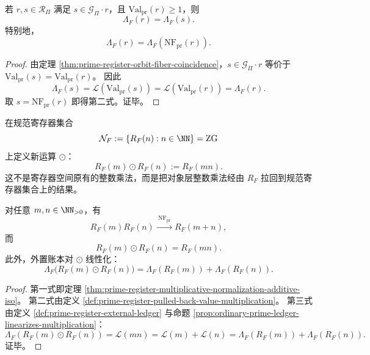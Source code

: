 \begin{proposition}[外置账本在值保持轨道上不变]\label{prop:prime-register-external-ledger-orbit-invariance}
若 \(r,s\in\mathcal R_{\Pi}\) 满足 \(s\in\mathcal G_{\Pi}\cdot r\)，且 \(\mathrm{Val}_{\mathrm{pr}}(r)\ge1\)，则
\[
\Lambda_F(r)=\Lambda_F(s).
\]
特别地，
\[
\Lambda_F(r)=\Lambda_F(\mathrm{NF}_{\mathrm{pr}}(r)).
\]
\end{proposition}

\begin{proof}
由定理 \ref{thm:prime-register-orbit-fiber-coincidence}，\(s\in\mathcal G_{\Pi}\cdot r\) 等价于 \(\mathrm{Val}_{\mathrm{pr}}(s)=\mathrm{Val}_{\mathrm{pr}}(r)\)。
因此
\[
\Lambda_F(s)=\mathcal L(\mathrm{Val}_{\mathrm{pr}}(s))
=\mathcal L(\mathrm{Val}_{\mathrm{pr}}(r))
=\Lambda_F(r).
\]
取 \(s=\mathrm{NF}_{\mathrm{pr}}(r)\) 即得第二式。证毕。
\end{proof}

\begin{definition}[拉回的值乘]\label{def:prime-register-pulled-back-value-multiplication}
在规范寄存器集合
\[
\mathcal N_F:=\{R_F(n):n\in\NN\}=\mathrm{ZG}
\]
上定义新运算 \(\odot\)：
\[
R_F(m)\odot R_F(n):=R_F(mn).
\]
这不是寄存器空间原有的整数乘法，而是把对象层整数乘法经由 \(R_F\) 拉回到规范寄存器集合上的结果。
\end{definition}

\begin{proposition}[内部乘法与拉回值乘的严格区分]\label{prop:prime-register-internal-vs-pulled-back-product}
对任意 \(m,n\in\NN_{>0}\)，有
\[
R_F(m)R_F(n)\xrightarrow{\ \mathrm{NF}_{\mathrm{pr}}\ }R_F(m+n),
\]
而
\[
R_F(m)\odot R_F(n)=R_F(mn).
\]
此外，外置账本对 \(\odot\) 线性化：
\[
\Lambda_F\bigl(R_F(m)\odot R_F(n)\bigr)
=\Lambda_F(R_F(m))+\Lambda_F(R_F(n)).
\]
\end{proposition}

\begin{proof}
第一式即定理 \ref{thm:prime-register-multiplicative-normalization-additive-iso}。
第二式由定义 \ref{def:prime-register-pulled-back-value-multiplication}。
第三式由定义 \ref{def:prime-register-external-ledger} 与命题 \ref{prop:ordinary-prime-ledger-linearizes-multiplication}：
\[
\Lambda_F(R_F(m)\odot R_F(n))
=\mathcal L(mn)
=\mathcal L(m)+\mathcal L(n)
=\Lambda_F(R_F(m))+\Lambda_F(R_F(n)).
\]
证毕。
\end{proof}

